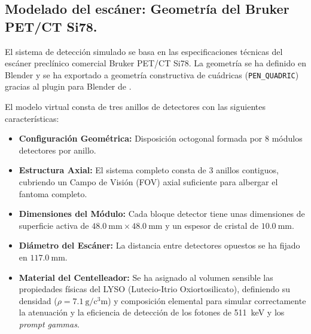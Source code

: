 \subsection{Modelado del escáner: Geometría del Bruker PET/CT Si78.}
\label{subsec:metodologia:escenario_sim:geometria_bruker}

El sistema de detección simulado se basa en las especificaciones técnicas del escáner preclínico comercial Bruker PET/CT Si78. La geometría se ha definido en Blender y se ha exportado a geometría constructiva de cuádricas (\texttt{PEN\_QUADRIC}) gracias al plugin para Blender de \penred.

El modelo virtual consta de tres anillos de detectores con las siguientes características:

\begin{itemize}
  \item \textbf{Configuración Geométrica:} Disposición octogonal formada por 8 módulos detectores por anillo.
  \item \textbf{Estructura Axial:} El sistema completo consta de 3 anillos contiguos, cubriendo un Campo de Visión (FOV) axial suficiente para albergar el fantoma completo.
  \item \textbf{Dimensiones del Módulo:} Cada bloque detector tiene unas dimensiones de superficie activa de $\SI{48.0}{\milli\meter} \times \SI{48.0}{\milli\meter}$ y un espesor de cristal de $\SI{10.0}{\milli\meter}$.
  \item \textbf{Diámetro del Escáner:} La distancia entre detectores opuestos se ha fijado en $\SI{117.0}{\milli\meter}$.
  \item \textbf{Material del Centelleador:} Se ha asignado al volumen sensible las propiedades físicas del LYSO (Lutecio-Itrio Oxiortosilicato), definiendo su densidad ($\rho = \SI{7.1}{\gram\per\cubic\centi\meter}$) y composición elemental para simular correctamente la atenuación y la eficiencia de detección de los fotones de \SI{511}{\kilo\electronvolt} y los \emph{prompt gammas}.
\end{itemize}

